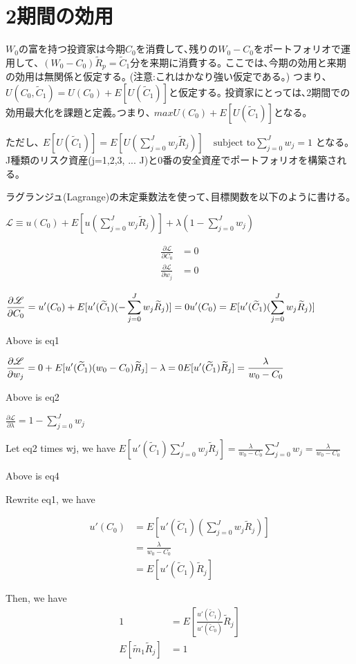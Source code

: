 \documentclass[uplatex,a4paper]{jsarticle}
\begin{document}
\section{2期間の効用}
$W_0$の富を持つ投資家は今期$C_0$を消費して､残りの$W_0 - C_0$をポートフォリオで運用して､
$(W_0 - C_0) \widetilde R_p = \widetilde C_1$分を来期に消費する｡
ここでは､今期の効用と来期の効用は無関係と仮定する｡
(注意:これはかなり強い仮定である｡)
つまり､
$U(C_0, \widetilde C_1) = U(C_0) + E[U(\widetilde C_1)]$と仮定する｡
投資家にとっては､2期間での効用最大化を課題と定義｡つまり､
$ max U(C_0) + E[U(\widetilde C_1)]$となる｡

ただし､
$E[U(\widetilde C_1)] = E[U(\sum_{j=0}^{J} w_j \widetilde R_j)]  \quad
\text{subject to}  \sum_{j=0}^{J} w_j = 1$ となる｡
J種類のリスク資産(j=1,2,3, ... J)と0番の安全資産でポートフォリオを構築される｡


ラグランジュ(Lagrange)の未定乗数法を使って､目標関数を以下のように書ける｡

$
\displaystyle
\mathscr{L} \equiv u(C_0) + E[u(\sum_{j=0}^{J} w_j \widetilde R_j)] + \lambda ( 1 - \sum_{j=0}^{J} w_j )
$


\begin{align*}
    \frac{\partial \mathscr{L} }{\partial C_0} & =  0 \\
    \frac{\partial \mathscr{L} }{\partial w_j} & =  0
\end{align*}


$
\displaystyle
\frac{\partial \mathscr{L} }{\partial C_0}  =
u'(C_0) + E[u'(\widetilde C_1)(-\sum_{j=0}^{J} w_j \widetilde R_j)]
= 0 \\
u'(C_0) = E[u'(\widetilde C_1)(\sum_{j=0}^{J} w_j \widetilde R_j)]
$

Above is eq1

$
\displaystyle
\frac{\partial \mathscr{L} }{\partial w_j}  =
0 + E[u'(\widetilde C_1)(w_0 - C_0)\widetilde R_j] - \lambda
= 0 \\
E[u'(\widetilde C_1)\widetilde R_j] = \frac{\lambda}{w_0 - C_0}
$

Above is eq2

$
\displaystyle
\frac{\partial \mathscr{L} }{\partial \lambda}  =
1 - \sum_{j=0}^{J} w_j
$

Let eq2 times wj, we have
$
\displaystyle
E[u'(\widetilde C_1) \sum_{j=0}^{J} w_j \widetilde R_j] = \frac{\lambda}{w_0 - C_0} \sum_{j=0}^{J}  w_j= \frac{\lambda}{w_0 - C_0}
$

Above is eq4


Rewrite eq1, we have

\begin{align*}
    u'(C_0)
            &= E[u'(\widetilde C_1)(\sum_{j=0}^{J} w_j \widetilde R_j)] \\
            &= \frac{\lambda}{w_0 - C_0} \\
            &= E[u'(\widetilde C_1)\widetilde R_j]
\end{align*}

Then, we have
\begin{align*}
    1 &= E[ \frac{u'(\widetilde C_1)}{u'(\widetilde C_0)}\widetilde R_j] \\
    E[\widetilde m_1 \widetilde R_j] &=1
\end{align*}
\end{document}

